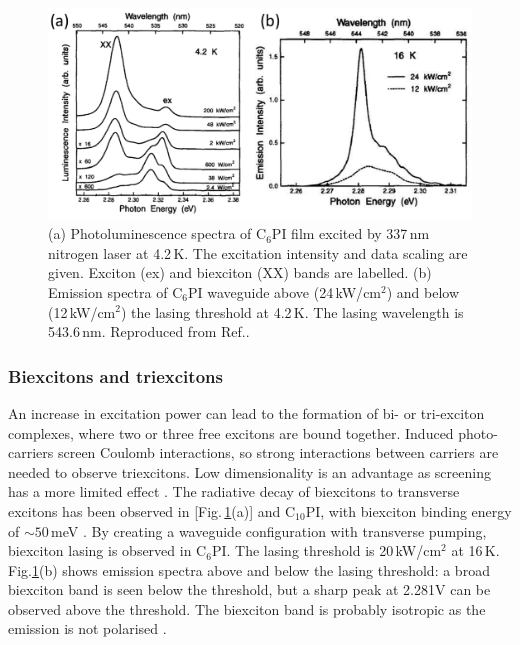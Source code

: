 \begin{figure}[h!]
\centering
\includegraphics[width=\textwidth]{Fig15}
\caption{(a) Photoluminescence spectra of $\textrm{C}_{6}$PI film excited by 337\,nm nitrogen laser at 4.2\,K. The excitation intensity and data scaling are given. Exciton (ex) and biexciton (XX) bands are labelled. (b) Emission spectra of $\textrm{C}_{6}$PI waveguide above (24\,kW/$\textrm{cm}^2$) and below (12\,kW/$\textrm{cm}^2$) the lasing threshold at 4.2\,K. The lasing wavelength is 543.6\,nm. Reproduced from Ref.\!.}
\label{2Fig15}
\end{figure}
\subsubsection{Biexcitons and triexcitons}
An increase in excitation power can lead to the formation of bi- or tri-exciton complexes, where two or three free excitons are bound together. Induced photo-carriers screen Coulomb interactions, so strong interactions between carriers are needed to observe triexcitons. Low dimensionality is an advantage as screening has a more limited effect \cite{Shimizu2006a}. The radiative decay of biexcitons to transverse excitons has been observed in  [Fig.\,\ref{2Fig15}(a)] and $\textrm{C}_{10}$PI, with biexciton binding energy of $\sim50$\,meV \cite{Kondo1998, Ishihara1992}. By creating a waveguide configuration with transverse pumping, biexciton lasing is observed in $\textrm{C}_6$PI. The lasing threshold is 20\,kW/$\textrm{cm}^2$ at 16\,K. Fig.\ref{2Fig15}(b) shows emission spectra above and below the lasing threshold: a broad biexciton band is seen below the threshold, but a sharp peak at 2.281V can be observed above the threshold. The biexciton band is probably isotropic as the emission is not polarised \cite{Kondo1998}.

